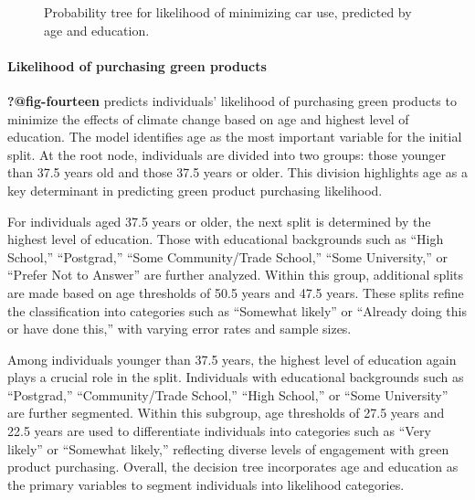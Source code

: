 \documentclass[
  letterpaper,
  DIV=11,
  numbers=noendperiod]{scrartcl}
\let\oldparagraph\paragraph
\renewcommand{\paragraph}[1]{\oldparagraph{#1}\mbox{}}
\begin{document}
\begin{figure}


\caption{\label{fig-thirteen}Probability tree for likelihood of
minimizing car use, predicted by age and education.}

\end{figure}%

\paragraph{Likelihood of purchasing green
products}\label{likelihood-of-purchasing-green-products}

\textbf{?@fig-fourteen} predicts individuals' likelihood of purchasing
green products to minimize the effects of climate change based on age
and highest level of education. The model identifies age as the most
important variable for the initial split. At the root node, individuals
are divided into two groups: those younger than 37.5 years old and those
37.5 years or older. This division highlights age as a key determinant
in predicting green product purchasing likelihood.

For individuals aged 37.5 years or older, the next split is determined
by the highest level of education. Those with educational backgrounds
such as ``High School,'' ``Postgrad,'' ``Some Community/Trade School,''
``Some University,'' or ``Prefer Not to Answer'' are further analyzed.
Within this group, additional splits are made based on age thresholds of
50.5 years and 47.5 years. These splits refine the classification into
categories such as ``Somewhat likely'' or ``Already doing this or have
done this,'' with varying error rates and sample sizes.

Among individuals younger than 37.5 years, the highest level of
education again plays a crucial role in the split. Individuals with
educational backgrounds such as ``Postgrad,'' ``Community/Trade
School,'' ``High School,'' or ``Some University'' are further segmented.
Within this subgroup, age thresholds of 27.5 years and 22.5 years are
used to differentiate individuals into categories such as ``Very
likely'' or ``Somewhat likely,'' reflecting diverse levels of engagement
with green product purchasing. Overall, the decision tree incorporates
age and education as the primary variables to segment individuals into
likelihood categories.
\end{document}
